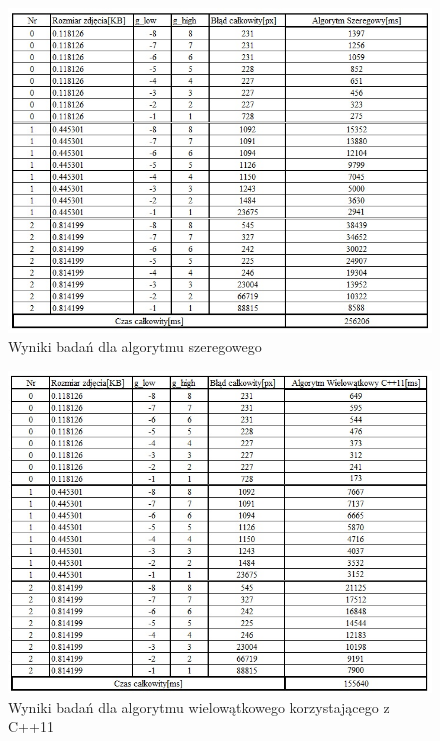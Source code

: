 \documentclass[document.tex]{subfiles}
\begin{document}
\begin{figure}[h]
\includegraphics[scale=0.75]{imgs/results_lap_serial}
\caption{Wyniki badań dla algorytmu szeregowego}
\label{fig:results_lap_serial}
\end{figure}

\begin{figure}[h]
\includegraphics[scale=0.75]{imgs/results_lap_cpp11_threads.jpg}
\caption{Wyniki badań dla algorytmu wielowątkowego korzystającego z C++11}
\label{fig:results_lap_cpp11_threads}
\end{figure}
\end{document}
